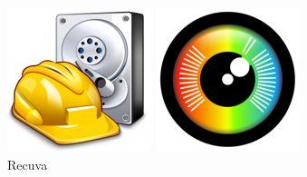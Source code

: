 \documentclass[12pt,oneside,slovak,a4paper]{article}
\begin{document}
\begin{figure}[H]
	\centering
	\begin{minipage}{.2\textwidth}
		\centering
        \includegraphics[width=\linewidth]{./images/tools-avatars/recuva.png}
		\captionsetup{justification=centering}
        \caption{Recuva}
    \end{minipage}\hfill
	\centering
	\begin{minipage}{.2\textwidth}
		\centering
        \includegraphics[width=\linewidth]{./images/tools-avatars/photo_rec.png}

\end{minipage}
\end{figure}
\end{document}
